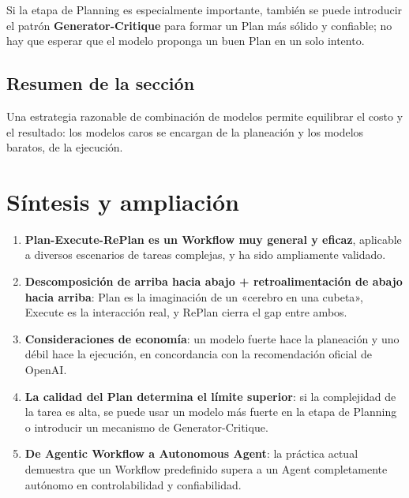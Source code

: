 \documentclass[a4paper]{article}
\begin{document}
Si la etapa de Planning es especialmente importante, también se puede introducir el patrón \textbf{Generator-Critique} para formar un Plan más sólido y confiable; no hay que esperar que el modelo proponga un buen Plan en un solo intento.

\subsection{Resumen de la sección}

Una estrategia razonable de combinación de modelos permite equilibrar el costo y el resultado: los modelos caros se encargan de la planeación y los modelos baratos, de la ejecución.

\section{Síntesis y ampliación}

\begin{enumerate}
    \item \textbf{Plan-Execute-RePlan es un Workflow muy general y eficaz}, aplicable a diversos escenarios de tareas complejas, y ha sido ampliamente validado.
    \item \textbf{Descomposición de arriba hacia abajo + retroalimentación de abajo hacia arriba}: Plan es la imaginación de un «cerebro en una cubeta», Execute es la interacción real, y RePlan cierra el gap entre ambos.
    \item \textbf{Consideraciones de economía}: un modelo fuerte hace la planeación y uno débil hace la ejecución, en concordancia con la recomendación oficial de OpenAI.
    \item \textbf{La calidad del Plan determina el límite superior}: si la complejidad de la tarea es alta, se puede usar un modelo más fuerte en la etapa de Planning o introducir un mecanismo de Generator-Critique.
    \item \textbf{De Agentic Workflow a Autonomous Agent}: la práctica actual demuestra que un Workflow predefinido supera a un Agent completamente autónomo en controlabilidad y confiabilidad.
\end{enumerate}
\end{document}
